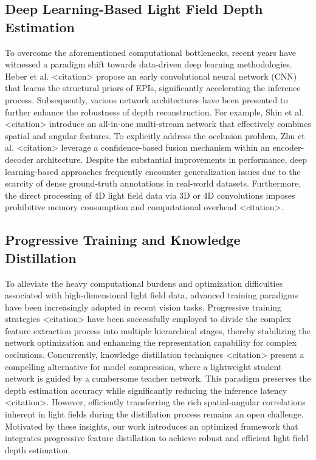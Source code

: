 \documentclass[lettersize,journal]{IEEEtran}
\begin{document}
\subsection{Deep Learning-Based Light Field Depth Estimation}
To overcome the aforementioned computational bottlenecks, recent years have witnessed a paradigm shift towards data-driven deep learning methodologies. Heber et al. <citation> propose an early convolutional neural network (CNN) that learns the structural priors of EPIs, significantly accelerating the inference process. Subsequently, various network architectures have been presented to further enhance the robustness of depth reconstruction. For example, Shin et al. <citation> introduce an all-in-one multi-stream network that effectively combines spatial and angular features. To explicitly address the occlusion problem, Zhu et al. <citation> leverage a confidence-based fusion mechanism within an encoder-decoder architecture. Despite the substantial improvements in performance, deep learning-based approaches frequently encounter generalization issues due to the scarcity of dense ground-truth annotations in real-world datasets. Furthermore, the direct processing of 4D light field data via 3D or 4D convolutions imposes prohibitive memory consumption and computational overhead <citation>.

\subsection{Progressive Training and Knowledge Distillation}
To alleviate the heavy computational burdens and optimization difficulties associated with high-dimensional light field data, advanced training paradigms have been increasingly adopted in recent vision tasks. Progressive training strategies <citation> have been successfully employed to divide the complex feature extraction process into multiple hierarchical stages, thereby stabilizing the network optimization and enhancing the representation capability for complex occlusions. Concurrently, knowledge distillation techniques <citation> present a compelling alternative for model compression, where a lightweight student network is guided by a cumbersome teacher network. This paradigm preserves the depth estimation accuracy while significantly reducing the inference latency <citation>. However, efficiently transferring the rich spatial-angular correlations inherent in light fields during the distillation process remains an open challenge. Motivated by these insights, our work introduces an optimized framework that integrates progressive feature distillation to achieve robust and efficient light field depth estimation.
\end{document}
